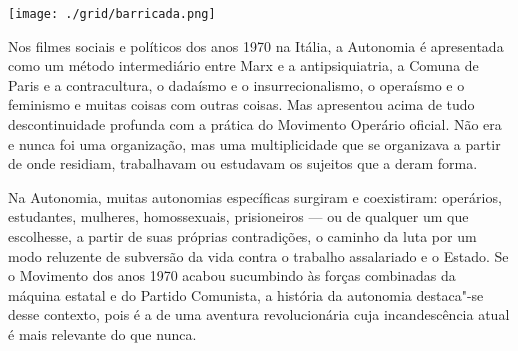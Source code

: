 \pagebreak %

\begin{center}
\hspace*{-3.6cm}
\hspace*{3.1cm}\texttt{[image: ./grid/barricada.png]}
\end{center}

\hspace*{-7cm}\hrulefill\hspace*{-7cm}

\medskip

\noindent{}Nos filmes sociais e políticos dos anos 1970 na Itália, a Autonomia é apresentada como um método intermediário entre Marx e a antipsiquiatria, a Comuna de Paris e a contracultura, o dadaísmo e o insurrecionalismo, o operaísmo e o feminismo e muitas coisas com outras coisas. Mas apresentou acima de tudo descontinuidade profunda com a prática do Movimento Operário oficial. Não era e nunca foi uma organização, mas uma multiplicidade que se organizava a partir de onde residiam, trabalhavam ou estudavam os sujeitos que a deram forma.

Na Autonomia, muitas autonomias específicas surgiram e coexistiram: operários, estudantes, mulheres, homossexuais, prisioneiros --- ou de qualquer um que escolhesse, a partir de suas próprias contradições, o caminho da luta por um modo reluzente de subversão da vida contra o trabalho assalariado e o Estado. Se o Movimento dos anos 1970 acabou sucumbindo às forças combinadas da máquina estatal e do Partido Comunista, a história da autonomia destaca"-se desse contexto, pois é a de uma aventura revolucionária cuja incandescência atual é mais relevante do que nunca. 

\vfill

\hspace*{-.4cm}\begin{minipage}[c]{1\linewidth}
\small{
{}}
\end{minipage}


